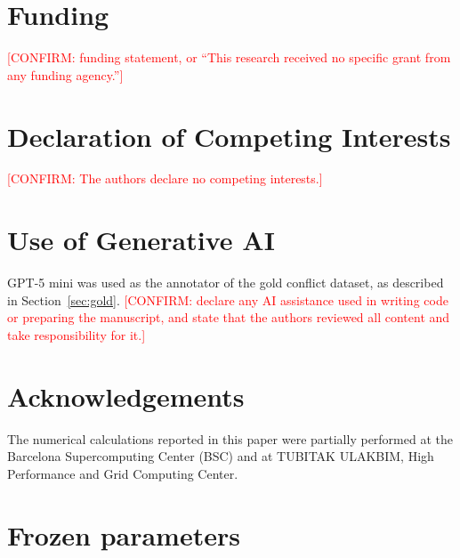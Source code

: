 \documentclass[journal=jcisd8,manuscript=article]{achemso}
\newcommand{\confirm}[1]{\textcolor{red}{[CONFIRM: #1]}} %
\begin{document}
\section*{Funding}

\confirm{funding statement, or ``This research received no specific grant from any funding agency.''}

\section*{Declaration of Competing Interests}

\confirm{The authors declare no competing interests.}

\section*{Use of Generative AI}

GPT-5 mini was used as the annotator of the gold conflict dataset, as described in Section~\ref{sec:gold}. \confirm{declare any AI assistance used in writing code or preparing the manuscript, and state that the authors reviewed all content and take responsibility for it.}

\section*{Acknowledgements}

The numerical calculations reported in this paper were partially performed at the Barcelona Supercomputing Center (BSC) and at TUBITAK ULAKBIM, High Performance and Grid Computing Center.

\appendix

\section{Frozen parameters}
\label{app:params}
\end{document}
